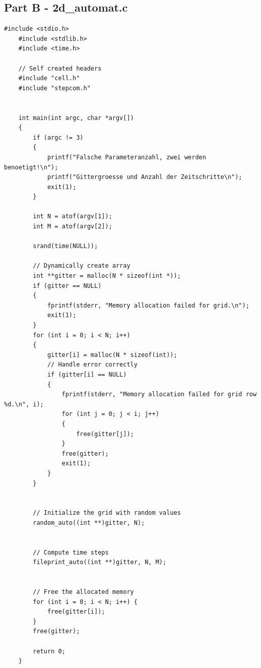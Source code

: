 \documentclass[12pt,a4paper]{article}
\begin{document}
\subsection*{\small Part B - 2d\_automat.c}
\begin{lstlisting}[caption={\small 2d\_automat.c},label={lst:p7001},basicstyle=\ttfamily\tiny]
    #include <stdio.h>
    #include <stdlib.h>
    #include <time.h>

    // Self created headers
    #include "cell.h"
    #include "stepcom.h"


    int main(int argc, char *argv[])
    {
        if (argc != 3)
        {
            printf("Falsche Parameteranzahl, zwei werden benoetigt!\n");
            printf("Gittergroesse und Anzahl der Zeitschritte\n");
            exit(1);
        }

        int N = atof(argv[1]);
        int M = atof(argv[2]);

        srand(time(NULL));

        // Dynamically create array
        int **gitter = malloc(N * sizeof(int *));
        if (gitter == NULL)
        {
            fprintf(stderr, "Memory allocation failed for grid.\n");
            exit(1);
        }
        for (int i = 0; i < N; i++)
        {
            gitter[i] = malloc(N * sizeof(int));
            // Handle error correctly
            if (gitter[i] == NULL)
            {
                fprintf(stderr, "Memory allocation failed for grid row %d.\n", i);
                for (int j = 0; j < i; j++)
                {
                    free(gitter[j]);
                }
                free(gitter);
                exit(1);
            }
        }


        // Initialize the grid with random values
        random_auto((int **)gitter, N);


        // Compute time steps
        fileprint_auto((int **)gitter, N, M);


        // Free the allocated memory
        for (int i = 0; i < N; i++) {
            free(gitter[i]);
        }
        free(gitter);

        return 0;
    }
\end{lstlisting}


\vspace{1cm}

\end{document}
